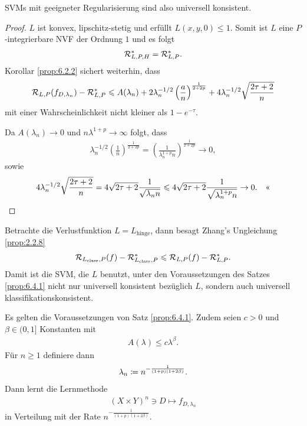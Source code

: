 SVMs mit geeigneter Regularisierung sind also universell konsistent.

\begin{proof}
$L$ ist konvex, lipschitz-stetig und erfüllt $L(x,y,0)\le 1$. Somit ist $L$ eine
$P$-integrierbare NVF der Ordnung $1$ und es folgt
\begin{align*}
\RR_{L,P,H}^* = \RR_{L,P}^*.
\end{align*}
Korollar \ref{prop:6.2.2} sichert weiterhin, dass
\begin{align*}
\RR_{L,P}(f_{D,\lambda_n}) - \RR_{L,P}^*
\le A(\lambda_n) + 2 \lambda_n^{-1/2} \left(\frac{a}{n}\right)^{\frac{1}{2+2p}}
+ 4 \lambda_n^{-1/2} \sqrt{\frac{2\tau+2}{n}}
\end{align*}
mit einer Wahrscheinlichkeit nicht kleiner als $1-e^{-\tau}$.

Da $A(\lambda_n)\to 0$ und $n\lambda^{1+p}\to \infty$ folgt, dass
\begin{align*}
\lambda_n^{-1/2} \left(\frac{1}{n}\right)^{\frac{1}{2+2p}}
= \left(\frac{1}{\lambda_n^{1+p}n}\right)^{\frac{1}{2+2p}} \to 0,
\end{align*}
sowie
\begin{align*}
4\lambda_n^{-1/2}\sqrt{\frac{2\tau+2}{n}}
= 4\sqrt{2\tau+2}\frac{1}{\sqrt{\lambda_n n}}
\le
4\sqrt{2\tau+2}\frac{1}{\sqrt{\lambda_n^{1+p} n}}
\to 0.\qedhere
\end{align*}
\end{proof}

\begin{bsp*}
Betrachte die Verlustfunktion $L=L_\mathrm{hinge}$, dann besagt Zhang's
Ungleichung \ref{prop:2.2.8}
\begin{align*}
\RR_{L_\mathrm{class},P}(f)-\RR_{L_\mathrm{class},P}^*
\le \RR_{L,P}(f)-\RR_{L,P}^*.
\end{align*}
Damit ist die SVM, die $L$ benutzt, unter den Voraussetzungen des Satzes
\ref{prop:6.4.1} nicht nur universell konsistent bezüglich $L$, sondern auch
universell klassifikationskonsistent.\maphere
\end{bsp*}

\begin{prop}
\label{prop:6.4.2}
Es gelten die Voraussetzungen von Satz \ref{prop:6.4.1}. Zudem seien $c > 0$ und
$\beta\in (0,1]$ Konstanten mit
\begin{align*}
A(\lambda) \le c\lambda^\beta.
\end{align*}
Für $n\ge 1$ definiere dann
\begin{align*}
\lambda_n \defl n^{-\frac{1}{(1+p)(1+2\beta)}}.
\end{align*}
Dann lernt die Lernmethode
\begin{align*}
(X\times Y)^n \ni D \mapsto f_{D,\lambda_n}
\end{align*}
in Verteilung mit der Rate $n^{-\frac{1}{(1+p)(1+2\beta)}}$.\fishhere
\end{prop}

